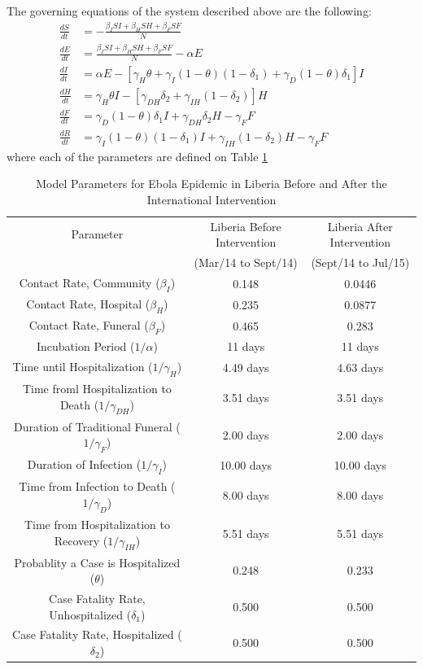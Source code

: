 \documentclass[10pt]{article}
\begin{document}
 
The governing equations of the system described above are the following:
\begin{align*} 
\frac{dS}{dt} &= - \frac{\beta_{I}SI+\beta_{H}SH+\beta_{F}SF}{N}\\
\frac{dE}{dt} &=  \frac{\beta_{I}SI+\beta_{H}SH+\beta_{F}SF}{N}-\alpha E\\
\frac{dI}{dt} &=  \alpha E - [\gamma_{H}\theta + \gamma_{I}(1-\theta)(1-\delta_{1})+\gamma_{D}(1-\theta)\delta_{1}]I\\
\frac{dH}{dt} &= \gamma_{H}\theta I - [\gamma_{DH}\delta_{2}+\gamma_{IH}(1-\delta_{2})]H\\
\frac{dF}{dt} &= \gamma_{D}(1-\theta) \delta_{1} I + \gamma_{DH}\delta_{2} H-\gamma_{F} F\\
\frac{dR}{dt} &= \gamma_{I}(1-\theta)(1- \delta_{1}) I + \gamma_{IH}(1-\delta_{2}) H-\gamma_{F} F
\end{align*}
where each of the parameters are defined on Table \ref{tab:parameters}


\begin{table}[ht]
\caption{Model Parameters for Ebola Epidemic in Liberia Before  and After the International Intervention} %
\centering %
\begin{tabular}{c c c } 
\hline\hline %
Parameter & Liberia Before Intervention  & Liberia After Intervention \\ [0.5ex] 
 & (Mar/14 to Sept/14) &  (Sept/14 to Jul/15) \\ [0.5ex] %
\hline %
Contact Rate, Community  ($\beta_{I}$) & 0.148 & 0.0446  \\ 
Contact Rate, Hospital  ($\beta_{H}$) & 0.235 & 0.0877  \\
Contact Rate, Funeral  ($\beta_{F}$) & 0.465 & 0.283 \\
Incubation Period (${1}/{\alpha}$) & 11 days & 11 days  \\
Time until Hospitalization (${1}/{\gamma_{H}}$) & 4.49 days & 4.63 days  \\
Time froml Hospitalization to Death (${1}/{\gamma_{DH}}$) & 3.51 days & 3.51 days  \\ 
Duration of Traditional Funeral (${1}/{\gamma_{F}}$) & 2.00 days & 2.00 days  \\
Duration of Infection (${1}/{\gamma_{I}}$) & 10.00 days & 10.00 days  \\
Time from Infection to Death (${1}/{\gamma_{D}}$) & 8.00 days & 8.00 days  \\
Time from Hospitalization to Recovery (${1}/{\gamma_{IH}}$) & 5.51 days & 5.51 days  \\
Probablity a Case is Hospitalized ($\theta$) & 0.248 & 0.233 \\
Case Fatality Rate, Unhospitalized ($\delta_{1}$) & 0.500  & 0.500  \\
Case Fatality Rate, Hospitalized ($\delta_{2}$) & 0.500 & 0.500 \\ [1ex] 
\hline 
\end{tabular}
\label{tab:parameters}
\end{table}
\end{document}
